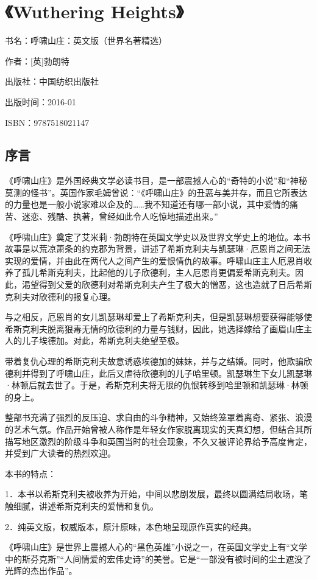 


\section{《Wuthering Heights》}


\par 书名：呼啸山庄：英文版（世界名著精选）
\par 作者：[英]勃朗特
\par 出版社：中国纺织出版社
\par 出版时间：2016-01
\par ISBN：9787518021147


\subsection*{序言}


\par 《呼啸山庄》是外国经典文学必读书目，是一部震撼人心的“奇特的小说”和“神秘莫测的怪书”。英国作家毛姆曾说：“《呼啸山庄》的丑恶与美并存，而且它所表达的力量也是一般小说家难以企及的……我不知道还有哪一部小说，其中爱情的痛苦、迷恋、残酷、执著，曾经如此令人吃惊地描述出来。”
\par 《呼啸山庄》奠定了艾米莉·勃朗特在英国文学史以及世界文学史上的地位。本书故事是以荒凉萧条的约克郡为背景，讲述了希斯克利夫与凯瑟琳·厄恩肖之间无法实现的爱情，并由此在两代人之间产生的爱恨情仇的故事。呼啸山庄主人厄恩肖收养了孤儿希斯克利夫，比起他的儿子欣德利，主人厄恩肖更偏爱希斯克利夫。因此，渴望得到父爱的欣德利对希斯克利夫产生了极大的憎恶，这也造就了日后希斯克利夫对欣德利的报复心理。
\par 与之相反，厄恩肖的女儿凯瑟琳却爱上了希斯克利夫，但是凯瑟琳想要获得能够使希斯克利夫脱离狠毒无情的欣德利的力量与钱财，因此，她选择嫁给了画眉山庄主人的儿子埃德加。对此，希斯克利夫绝望至极。
\par 带着复仇心理的希斯克利夫故意诱惑埃德加的妹妹，并与之结婚。同时，他欺骗欣德利并得到了呼啸山庄，此后又虐待欣德利的儿子哈里顿。凯瑟琳生下女儿凯瑟琳·林顿后就去世了。于是，希斯克利夫将无限的仇恨转移到哈里顿和凯瑟琳·林顿的身上。
\par 整部书充满了强烈的反压迫、求自由的斗争精神，又始终笼罩着离奇、紧张、浪漫的艺术气氛。作品开始曾被人称作是年轻女作家脱离现实的天真幻想，但结合其所描写地区激烈的阶级斗争和英国当时的社会现象，不久又被评论界给予高度肯定，并受到广大读者的热烈欢迎。
\par 本书的特点：
\par 1．本书以希斯克利夫被收养为开始，中间以悲剧发展，最终以圆满结局收场，笔触细腻，讲述希斯克利夫的爱情和复仇。
\par 2．纯英文版，权威版本，原汁原味，本色地呈现原作真实的经典。
\par 《呼啸山庄》是世界上震撼人心的“黑色英雄”小说之一，在英国文学史上有“文学中的斯芬克斯”“人间情爱的宏伟史诗”的美誉。它是“一部没有被时间的尘土遮没了光辉的杰出作品”。





